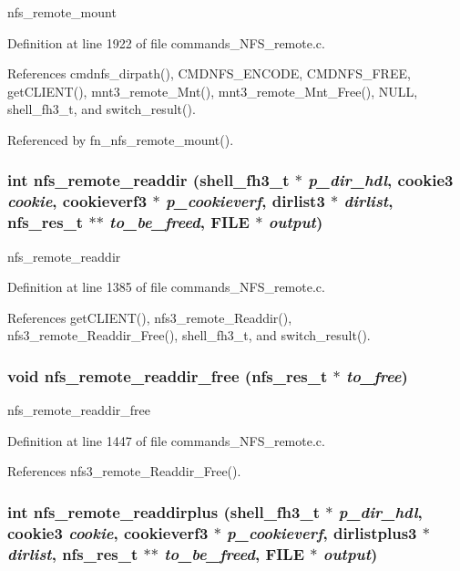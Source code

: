 nfs\_\-remote\_\-mount 

Definition at line 1922 of file commands\_\-NFS\_\-remote.c.

References cmdnfs\_\-dirpath(), CMDNFS\_\-ENCODE, CMDNFS\_\-FREE, get\-CLIENT(), mnt3\_\-remote\_\-Mnt(), mnt3\_\-remote\_\-Mnt\_\-Free(), NULL, shell\_\-fh3\_\-t, and switch\_\-result().

Referenced by fn\_\-nfs\_\-remote\_\-mount().
\subsubsection{\setlength{\rightskip}{0pt plus 5cm}int nfs\_\-remote\_\-readdir ({\bf shell\_\-fh3\_\-t} $\ast$ {\em p\_\-dir\_\-hdl}, cookie3 {\em cookie}, cookieverf3 $\ast$ {\em p\_\-cookieverf}, dirlist3 $\ast$ {\em dirlist}, nfs\_\-res\_\-t $\ast$$\ast$ {\em to\_\-be\_\-freed}, FILE $\ast$ {\em output})}\label{commands__NFS__remote_8c_a46}


nfs\_\-remote\_\-readdir 

Definition at line 1385 of file commands\_\-NFS\_\-remote.c.

References get\-CLIENT(), nfs3\_\-remote\_\-Readdir(), nfs3\_\-remote\_\-Readdir\_\-Free(), shell\_\-fh3\_\-t, and switch\_\-result().
\subsubsection{\setlength{\rightskip}{0pt plus 5cm}void nfs\_\-remote\_\-readdir\_\-free (nfs\_\-res\_\-t $\ast$ {\em to\_\-free})}\label{commands__NFS__remote_8c_a47}


nfs\_\-remote\_\-readdir\_\-free 

Definition at line 1447 of file commands\_\-NFS\_\-remote.c.

References nfs3\_\-remote\_\-Readdir\_\-Free().
\subsubsection{\setlength{\rightskip}{0pt plus 5cm}int nfs\_\-remote\_\-readdirplus ({\bf shell\_\-fh3\_\-t} $\ast$ {\em p\_\-dir\_\-hdl}, cookie3 {\em cookie}, cookieverf3 $\ast$ {\em p\_\-cookieverf}, dirlistplus3 $\ast$ {\em dirlist}, nfs\_\-res\_\-t $\ast$$\ast$ {\em to\_\-be\_\-freed}, FILE $\ast$ {\em output})}\label{commands__NFS__remote_8c_a44}



